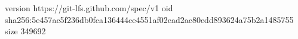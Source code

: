 version https://git-lfs.github.com/spec/v1
oid sha256:5e457ac5f236db0fca136444ce4551af02ead2ac80edd893624a75b2a1485755
size 349692
